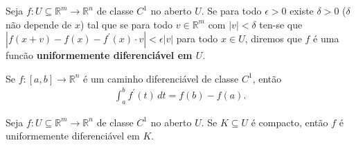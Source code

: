 \begin{definition}
  Seja $f:U\subseteq \mathbb{R}^{m}\to\mathbb{R}^{n}$ de classe $C^{1}$ no aberto $U$. Se para todo $\epsilon>0$ existe $\delta>0$ ($\delta$ não depende de $x$) tal que se para todo $v\in \mathbb{R}^{m}$ com $|v|< \delta$ ten-se que $|f(x+v)-f(x)-f^{\prime}(x)\cdot v|< \epsilon|v|$ para todo $x\in U$, diremos que $f$ é uma funcão \textbf{uniformemente diferenciável em $U$}. 
\end{definition}
\begin{proposition}
  Se $f:[a,b]\to\mathbb{R}^{n}$ é um caminho diferenciável de classe $C^{1}$, então
  \begin{align*}
    \int_{a}^{b}f^{\prime}(t)\, dt=f(b)-f(a).
  \end{align*}
\end{proposition}
\begin{theorem}
  Seja $f:U\subseteq \mathbb{R}^{m}\to\mathbb{R}^{n}$ de classe $C^{1}$ no aberto $U$. Se $K\subseteq U$ é compacto, então $f$ é uniformemente diferenciável em $K$. 
\end{theorem}
